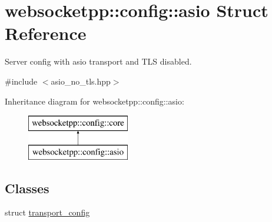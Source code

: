 \hypertarget{structwebsocketpp_1_1config_1_1asio}{}\section{websocketpp\+:\+:config\+:\+:asio Struct Reference}
\label{structwebsocketpp_1_1config_1_1asio}


Server config with asio transport and T\+L\+S disabled.  




{\ttfamily \#include $<$asio\+\_\+no\+\_\+tls.\+hpp$>$}

Inheritance diagram for websocketpp\+:\+:config\+:\+:asio\+:\begin{figure}[H]
\begin{center}
\leavevmode
\includegraphics[height=2.000000cm]{structwebsocketpp_1_1config_1_1asio}
\end{center}
\end{figure}
\subsection*{Classes}
\begin{DoxyCompactItemize}
\item 
struct \hyperlink{structwebsocketpp_1_1config_1_1asio_1_1transport__config}{transport\+\_\+config}
\end{DoxyCompactItemize}
